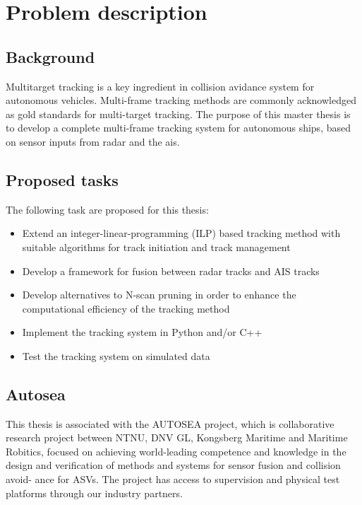 
\section*{Problem description}

\subsection*{Background}\label{sub:background}
Multitarget tracking is a key ingredient in collision avidance system for autonomous vehicles. Multi-frame tracking methods are commonly acknowledged as gold standards for multi-target tracking. The purpose of this master thesis is to develop a complete multi-frame tracking system for autonomous ships, based on sensor inputs from radar and the \gls{ais}.

\subsection*{Proposed tasks}\label{sub:proposed_tasks}
The following task are proposed for this thesis:
\begin{itemize}
	\item{Extend an integer-linear-programming (ILP) based tracking method with suitable algorithms for track initiation and track management}
	\item{Develop a framework for fusion between radar tracks and AIS tracks}
	\item{Develop alternatives to N-scan pruning in order to enhance the computational efficiency of the tracking method}
	\item{Implement the tracking system in Python and/or C++}
	\item{Test the tracking system on simulated data}
\end{itemize}

\subsection*{Autosea}\label{sub:autosea}
This thesis is associated with the AUTOSEA project, which is collaborative research project between NTNU, DNV GL, Kongsberg Maritime and Maritime Robitics, focused on achieving world-leading competence and knowledge in the design and verification of methods and systems for sensor fusion and collision avoid- ance for ASVs. The project has access to supervision and physical test platforms through our industry partners.